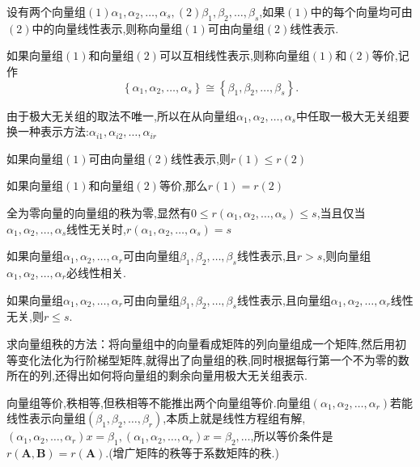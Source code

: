 \begin{definition}
    设有两个向量组$(1)\alpha_1,\alpha_2,\dots,\alpha_s,(2)\beta_1,\beta_2,\dots,\beta_s$,如果$(1)$中的每个向量均可由$(2)$中的向量线性表示,则称向量组$(1)$可由向量组$(2)$线性表示.

    如果向量组$(1)$和向量组$(2)$可以互相线性表示,则称向量组$(1)$和$(2)$等价,记作
    \begin{equation*}
        \left\{\alpha_1,\alpha_2,\dots,\alpha_s\right\} \cong \left\{\beta_1,\beta_2,\dots,\beta_s\right\} .
    \end{equation*}
\end{definition}
由于极大无关组的取法不唯一,所以在从向量组$\alpha_1,\alpha_2,\dots,\alpha_s$中任取一极大无关组要换一种表示方法:$\alpha_{i1},\alpha_{i2},\dots,\alpha_{ir}$
\begin{ttheorem}
    如果向量组$(1)$可由向量组$(2)$线性表示,则$r(1)\leqslant r(2)$
\end{ttheorem}
\begin{ttheorem}
    如果向量组$(1)$和向量组$(2)$等价,那么$r(1)=r(2)$
\end{ttheorem}
\begin{ttheorem}
    全为零向量的向量组的秩为零,显然有$0 \leqslant r(\alpha_1,\alpha_2,\dots,\alpha_s) \leqslant s$,{\color{Blue}当且仅当$\alpha_1,\alpha_2,\dots,\alpha_s$线性无关时,$r(\alpha_1,\alpha_2,\dots,\alpha_s) = s$}
\end{ttheorem}
\begin{ttheorem}
    如果向量组$\alpha_1,\alpha_2,\dots,\alpha_r$可由向量组$\beta_1,\beta_2,\dots,\beta_s$线性表示,且$r>s$,则向量组$\alpha_1,\alpha_2,\dots,\alpha_r$必线性相关.
\end{ttheorem}
\begin{ttheorem}
    如果向量组$\alpha_1,\alpha_2,\dots,\alpha_r$可由向量组$\beta_1,\beta_2,\dots,\beta_s$线性表示,且向量组$\alpha_1,\alpha_2,\dots,\alpha_r$线性无关,则$r \leqslant s$.
\end{ttheorem}

求向量组秩的方法：将向量组中的向量看成矩阵的列向量组成一个矩阵,然后用初等变化法化为行阶梯型矩阵,就得出了向量组的秩,同时根据每行第一个不为零的数所在的列,还得出如何将向量组的剩余向量用极大无关组表示.

向量组等价,秩相等,但秩相等不能推出两个向量组等价.向量组$(\alpha_1,\alpha_2,\dots,\alpha_r)$若能线性表示向量组$(\beta_1,\beta_2,\dots,\beta_r)$,本质上就是线性方程组有解,$(\alpha_1,\alpha_2,\dots,\alpha_r)x=\beta_1,(\alpha_1,\alpha_2,\dots,\alpha_r)x=\beta_2,\dots$,所以等价条件是$r(\mathbf{A},\mathbf{B})=r(\mathbf{A})$.(增广矩阵的秩等于系数矩阵的秩.)

